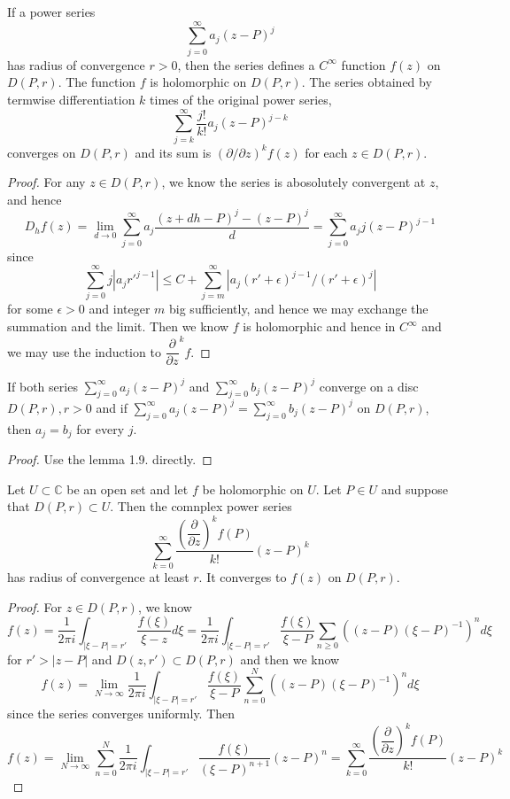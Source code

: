 \documentclass[lang=en, color=blue, ]{elegantbook}
\newcommand{\C}{\mathbb{C}}
\newcommand{\ParZ}{\dfrac{\partial}{\partial z}}
\begin{document}
\begin{lemma}
    If a power series
    \[\sum\limits_{j=0}^{\infty}a_j(z-P)^j\]
    has radius of convergence $r>0$, then the series defines a $C^{\infty}$ function $f(z)$ on $D(P,r)$. The function $f$ is holomorphic on $D(P,r)$. The series obtained by termwise differentiation $k$ times of the original power series,
    \[
    \sum\limits_{j=k}^{\infty}\dfrac{j!}{k!}a_j(z-P)^{j-k}
    \]
    converges on $D(P,r)$ and its sum is $(\partial/\partial z)^k f(z)$ for each $z\in D(P,r)$. 
\end{lemma}
\begin{proof}\par
    For any $z\in D(P,r)$, we know the series is abosolutely convergent at $z$, and hence
    \[
    D_h f(z) = \lim_{d\to 0}\sum\limits_{j=0}^{\infty}a_j\dfrac{(z+dh-P)^j-(z-P)^j}{d} = \sum\limits_{j=0}^{\infty} a_jj(z-P)^{j-1}
    \]
    since
    \[
    \sum\limits_{j=0}^{\infty} j|a_jr'^{j-1}| \leq C + \sum\limits_{j=m}^{\infty}|a_j(r'+\epsilon)^{j-1}/(r'+\epsilon)^{j}|
    \]
    for some $\epsilon > 0$ and integer $m$ big sufficiently, and hence we may exchange the summation and the limit. Then we know $f$ is holomorphic and hence in $C^{\infty}$ and we may use the induction to $\ParZ^k f$.
\end{proof}

\begin{proposition}
    If both series $\sum_{j=0}^{\infty} a_j(z-P)^j$ and $\sum_{j=0}^{\infty} b_j(z-P)^j$ converge on a disc $D(P,r), r > 0$ and if $\sum_{j=0}^{\infty}a_j(z-P)^j = \sum_{j=0}^{\infty} b_j(z-P)^j$ on $D(P,r)$, then $a_j = b_j$ for every $j$.  
\end{proposition}
\begin{proof}\par
    Use the lemma 1.9. directly.
\end{proof}

\begin{theorem}
    Let $U\subset\C$ be an open set and let $f$ be holomorphic on $U$. Let $P\in U$ and suppose that $D(P,r)\subset U$. Then the comnplex power series
    \[\sum\limits_{k=0}^{\infty} \dfrac{(\ParZ)^kf(P)}{k!}(z-P)^k\]
    has radius of convergence at least $r$. It converges to $f(z)$ on $D(P,r)$.
\end{theorem}
\begin{proof}\par
    For $z\in D(P,r)$, we know
    \[
    f(z) = \dfrac{1}{2\pi i}\int_{|\xi-P| = r'}\dfrac{f(\xi)}{\xi-z}d\xi = \dfrac{1}{2\pi i}\int_{|\xi-P| = r'}\dfrac{f(\xi)}{\xi-P}\sum\limits_{n\geq 0}((z-P)(\xi-P)^{-1})^nd\xi
    \]
    for $r' > |z-P|$ and $D(z,r')\subset D(P,r)$ and then we know
    \[
    f(z) = \lim_{N\to\infty}\dfrac{1}{2\pi i}\int_{|\xi-P| = r'}\dfrac{f(\xi)}{\xi-P}\sum\limits_{n= 0}^N((z-P)(\xi-P)^{-1})^nd\xi
    \]
    since the series converges uniformly. Then
    \[
    f(z) = \lim_{N\to\infty}\sum\limits_{n=0}^N \dfrac{1}{2\pi i }\int_{|\xi-P| = r'}\dfrac{f(\xi)}{(\xi-P)^{n+1}}(z-P)^n = \sum\limits_{k=0}^{\infty} \dfrac{(\ParZ)^kf(P)}{k!}(z-P)^k
    \]
\end{proof}
\end{document}
